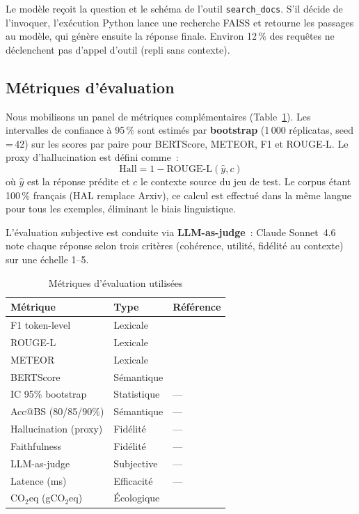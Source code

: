 \documentclass[10pt,journal,compsoc]{IEEEtran}
\newcommand{\bs}{BERTScore}
\newcommand{\rl}{ROUGE-L}
\newcommand{\met}{METEOR}
\begin{document}
Le modèle reçoit la question et le schéma de l'outil \texttt{search\_docs}.
S'il décide de l'invoquer, l'exécution Python lance une recherche FAISS
et retourne les passages au modèle, qui génère ensuite la réponse finale.
Environ 12\,\% des requêtes ne déclenchent pas d'appel d'outil
(repli sans contexte).

\subsection{Métriques d'évaluation}
\label{subsec:metriques}

Nous mobilisons un panel de métriques complémentaires
(Table~\ref{tab:metriques}). Les intervalles de confiance à 95\,\% sont
estimés par \textbf{bootstrap} (1\,000 réplicatas, seed\,=\,42) sur
les scores par paire pour \bs{}, \met{}, F1 et \rl{}. Le proxy
d'hallucination est défini comme~:
\[
  \text{Hall} = 1 - \text{ROUGE-L}(\hat{y}, c)
\]
où $\hat{y}$ est la réponse prédite et $c$ le contexte source du jeu
de test. Le corpus étant 100\,\% français (HAL remplace Arxiv),
ce calcul est effectué dans la même langue pour tous les exemples,
éliminant le biais linguistique.

L'évaluation subjective est conduite via \textbf{LLM-as-judge}~:
Claude Sonnet~4.6 note chaque réponse selon trois critères
(cohérence, utilité, fidélité au contexte) sur une échelle 1--5.

\begin{table}[h]
  \centering
  \caption{Métriques d'évaluation utilisées}
  \label{tab:metriques}
  \renewcommand{\arraystretch}{1.2}
  \begin{tabular}{lll}
    \toprule
    \textbf{Métrique} & \textbf{Type} & \textbf{Référence} \\
    \midrule
    F1 token-level     & Lexicale    & \cite{rajpurkar2016squad} \\
    ROUGE-L            & Lexicale    & \cite{lin2004rouge} \\
    METEOR             & Lexicale    & \cite{banerjee2005meteor} \\
    BERTScore          & Sémantique  & \cite{zhang2020bertscore} \\
    IC 95\% bootstrap  & Statistique & --- \\
    Acc@BS (80/85/90\%) & Sémantique & --- \\
    Hallucination (proxy) & Fidélité & --- \\
    Faithfulness       & Fidélité    & --- \\
    LLM-as-judge       & Subjective  & --- \\
    Latence (ms)       & Efficacité  & --- \\
    CO$_2$eq (gCO$_2$eq) & Écologique & \cite{strubell2019energy} \\
    \bottomrule
  \end{tabular}
\end{table}
\end{document}
